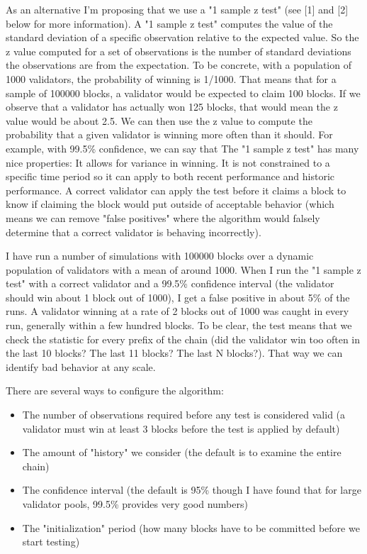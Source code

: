 As an alternative I'm proposing that we use a "1 sample z test" (see [1]
and [2] below for more information). A "1 sample z test" computes the
value of the standard deviation of a specific observation relative to
the expected value. So the z value computed for a set of observations is
the number of standard deviations the observations are from the
expectation. To be concrete, with a population of 1000 validators, the
probability of winning is 1/1000. That means that for a sample of 100000
blocks, a validator would be expected to claim 100 blocks. If we observe
that a validator has actually won 125 blocks, that would mean the z
value would be about 2.5. We can then use the z value to compute the
probability that a given validator is winning more often than it
should. For example, with 99.5\% confidence, we can say that The "1
sample z test" has many nice properties: It allows for variance in
winning. It is not constrained to a specific time period so it can apply
to both recent performance and historic performance. A correct validator
can apply the test before it claims a block to know if claiming the
block would put outside of acceptable behavior (which means we can
remove "false positives" where the algorithm would falsely determine
that a correct validator is behaving incorrectly).

I have run a number of simulations with 100000 blocks over a dynamic
population of validators with a mean of around 1000. When I run the "1
sample z test" with a correct validator and a 99.5\% confidence interval
(the validator should win about 1 block out of 1000), I get a false
positive in about 5\% of the runs. A validator winning at a rate of 2
blocks out of 1000 was caught in every run, generally within a few
hundred blocks. To be clear, the test means that we check the statistic
for every prefix of the chain (did the validator win too often in the
last 10 blocks? The last 11 blocks? The last N blocks?). That way we
can identify bad behavior at any scale.

There are several ways to configure the algorithm: 

\begin{itemize}
\item The number of observations required before any test is considered
  valid (a validator must win at least 3 blocks before the test is
  applied by default)

\item The amount of "history" we consider (the default is to examine the
  entire chain)

\item The confidence interval (the default is 95\% though I have found
  that for large validator pools, 99.5\% provides very good numbers)

\item The "initialization" period (how many blocks have to be committed
  before we start testing)
\end{itemize}


